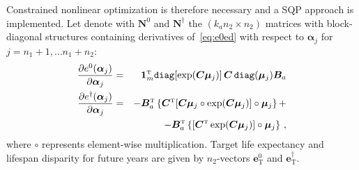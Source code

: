\documentclass[twoside]{report}
\begin{document}

Constrained nonlinear optimization is therefore	necessary and a SQP approach is implemented. Let denote with $\bm{N}^{0}$ and $\bm{N}^{\dagger}$ the $(k_{a}n_{2} \times n_{2})$ matrices with block-diagonal structures containing derivatives of~\eqref{eq:e0ed} with respect to $\bm{\alpha}_{j}$ for $j=n_{1}+1, \ldots n_{1}+n_{2}$:
\begin{eqnarray}\label{eq:Der}
\frac{\partial e^{0} (\bm{\alpha}_{j})}{\partial \bm{\alpha}_{j}} &=& \bm{1}_{m}^{\T} \verb"diag"[\exp(\bm{C}\bm{\mu}_{j})] \,	\bm{C} \,\verb"diag"(\bm{\mu}_{j}) \bm{B}_{a}\\
\frac{\partial e^{\dagger} (\bm{\alpha}_{j})}{\partial \bm{\alpha}_{j}} &=& - \bm{B}_{a}^{\T} \left\{ \bm{C}^{\T}[\bm{C}\bm{\mu}_{j} \circ \exp(\bm{C}\bm{\mu}_{j})] \circ \bm{\mu}_{j} \right\} + \nonumber\\
&& - \bm{B}_{a}^{\T} \left\{ [\bm{C}^{\T} \exp(\bm{C}\bm{\mu}_{j})] \circ \bm{\mu}_{j} \right\} \nonumber\, ,
\end{eqnarray}
where $\circ$ represents element-wise multiplication. Target life expectancy and lifespan disparity for future years are given by $n_{2}$-vectors $\bm{e}^{0}_{\mathrm{T}}$ and $\bm{e}^{\dagger}_{\mathrm{T}}$.
\end{document}
